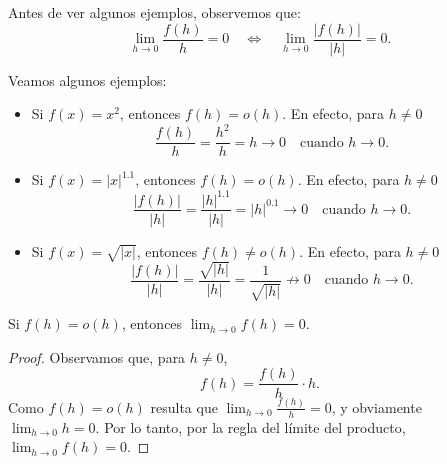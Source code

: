 Antes de ver algunos ejemplos, observemos que:
\[
\lim_{h\to 0} \frac{f(h)}{h} = 0
\quad\iff\quad
\lim_{h\to 0} \frac{|f(h)|}{|h|} = 0.
\]

\begin{example} Veamos algunos ejemplos:
\begin{itemize}
    \item Si $f(x) = x^2$, entonces $f(h) = o(h)$.
    En efecto, para $h\neq 0$
    \[
    \frac{f(h)}h = \frac{h^2}{h} = h \to 0 \quad\text{cuando $h\to0$}.
    \]
    \item Si $f(x) = |x|^{1.1}$, entonces $f(h) = o(h)$.
    En efecto, para $h\neq 0$
    \[
    \frac{|f(h)|}{|h|} = \frac{|h|^{1.1}}{|h|} = |h|^{0.1} \to 0 \quad\text{cuando $h\to0$}.
    \]
    \item Si $f(x) = \sqrt{|x|}$, entonces $f(h) \neq o(h)$.
    En efecto, para $h\neq 0$
    \[
     \frac{|f(h)|}{|h|} = \frac{\sqrt{|h|}}{|h|} = \frac1{\sqrt{|h|}} \not\to 0 \quad\text{cuando $h\to0$}.
    \]
\end{itemize}
\end{example}

\begin{lemma}
  Si $f(h)=o(h)$, entonces $\lim_{h\to0}f(h) = 0$.
\end{lemma}

\begin{proof}
    Observamos que, para $h\neq 0$,
    \[
    f(h) = \frac{f(h)}{h} \cdot h .
    \]
    Como $f(h)=o(h)$ resulta que $\lim_{h\to0} \frac{f(h)}{h} = 0$, y obviamente $\lim_{h\to0}h=0$.
    Por lo tanto, por la regla del límite del producto, $\lim_{h\to0}f(h)=0$.
\end{proof}

